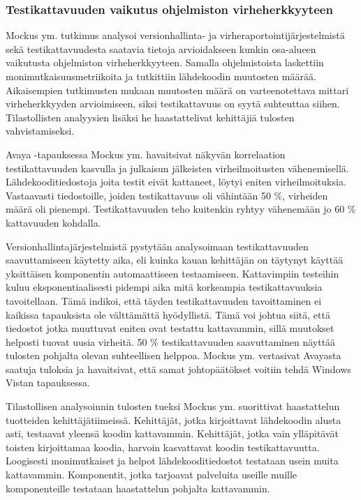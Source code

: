 \documentclass[finnish]{../tktltiki2}
\theoremstyle{definition}
\theoremstyle{remark}
\begin{document}
\subsubsection{Testikattavuuden vaikutus ohjelmiston virheherkkyyteen}

Mockus ym. tutkimus analysoi versionhallinta- ja virheraportointijärjestelmistä sekä testikattavuudesta saatavia tietoja 
arvioidakseen kunkin osa-alueen vaikutusta ohjelmiston virheherkkyyteen. Samalla ohjelmistoista laskettiin 
monimutkaisuusmetriikoita ja tutkittiin lähdekoodin muutosten määrää. Aikaisempien tutkimusten mukaan muutosten määrä on 
varteenotettava mittari virheherkkyyden arvioimiseen, siksi testikattavuus on syytä suhteuttaa siihen. Tilastollisten 
analyysien lisäksi he haastattelivat kehittäjiä tulosten vahvistamiseksi.

    Avaya -tapauksessa Mockus ym. havaitsivat näkyvän korrelaation testikattavuuden kasvulla ja julkaisun jälkeisten 
virheilmoitusten vähenemisellä. Lähdekooditiedostoja joita testit eivät kattaneet, löytyi eniten virheilmoituksia. 
Vastaavasti tiedostoille, joiden testikattavuus oli vähintään 50 \%, virheiden määrä oli pienempi. Testikattavuuden 
teho kuitenkin ryhtyy vähenemään jo 60 \% kattavuuden kohdalla.

    Versionhallintajärjestelmistä pystytään analysoimaan testikattavuuden saavuttamiseen käytetty aika, eli kuinka kauan 
kehittäjän on täytynyt käyttää yksittäisen komponentin automaattiseen testaamiseen. Kattavimpiin testeihin kuluu 
eksponentiaalisesti pidempi aika mitä korkeampia testikattavuuksia tavoitellaan. Tämä indikoi, että täyden 
testikattavuuden tavoittaminen ei kaikissa tapauksista ole välttämättä hyödyllistä. Tämä voi johtua siitä, että 
tiedostot jotka muuttuvat eniten ovat testattu kattavammin, sillä muutokset helposti tuovat uusia virheitä. 50 \% 
testikattavuuden saavuttaminen näyttää tulosten pohjalta olevan suhteellisen helppoa. Mockus ym. vertasivat Avayasta 
saatuja tuloksia ja havaitsivat, että samat johtopäätökset voitiin tehdä Windows Vistan tapauksessa.

    Tilastollisen analysoinnin tulosten tueksi Mockus ym. suorittivat haastattelun tuotteiden kehittäjätiimeissä. 
Kehittäjät, jotka kirjoittavat lähdekoodin alusta asti, testaavat yleensä koodin kattavammin. Kehittäjät, jotka vain 
ylläpitävät toisten kirjoittamaa koodia, harvoin kasvattavat koodin testikattavuutta. Loogisesti monimutkaiset 
ja helpot lähdekooditiedostot testataan usein muita kattavammin. Komponentit, jotka tarjoavat palveluita useille muille 
komponenteille testataan haastattelun pohjalta kattavammin.
\end{document}
